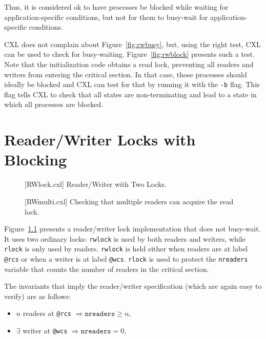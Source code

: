 \documentclass{report}
\newenvironment{code}{
\tcolorbox
}{
\endtcolorbox
}
\begin{document}
Thus, it is considered ok to have processes be blocked while waiting
for application-specific conditions, but not for them to
busy-wait for application-specific conditions.

CXL does not complain about Figure~\ref{fig:rwbusy}, but, using
the right test, CXL can be used to check for busy-waiting.
Figure~\ref{fig:rwblock} presents such a test.
Note that the initialization code obtains a read lock, preventing
all readers and writers from entering the critical section.
In that case, those processes should ideally be blocked and CXL
can test for that by running it with the \texttt{-b} flag.
This flag tells CXL to check
that all states are non-terminating and lead to a state in which
all processes are blocked.

\chapter{Reader/Writer Locks with Blocking}
\label{ch:rdwr2}

\begin{figure}
\begin{code}
\end{code}
\caption{[RWlock.cxl] Reader/Writer with Two Locks.}
\label{fig:rw2lock}
\end{figure}

\begin{figure}
\begin{code}
\end{code}
\caption{[RWmulti.cxl] Checking that multiple readers can acquire the read lock.}
\label{fig:rwmulti}
\end{figure}

Figure~\ref{fig:rw2lock} presents a reader/writer lock implementation
that does not busy-wait.
It uses two ordinary locks: \texttt{rwlock} is used by both readers and writers,
while \texttt{rlock} is only used by readers.
\texttt{rwlock} is held either when readers are at label \texttt{@rcs}
or when a writer is at label \texttt{@wcs}.
\texttt{rlock} is used to protect the \texttt{nreaders} variable that
counts the number of readers in the critical section. 

The invariants that imply the reader/writer specification
(which are again easy to verify) are as follows:

\begin{itemize}
\item $n$ readers at \texttt{@rcs} $\Rightarrow \mathtt{nreaders} \ge n$,
\item $\exists$ writer at \texttt{@wcs} $\Rightarrow \mathtt{nreaders} = 0$,
\end{itemize}
\end{document}
